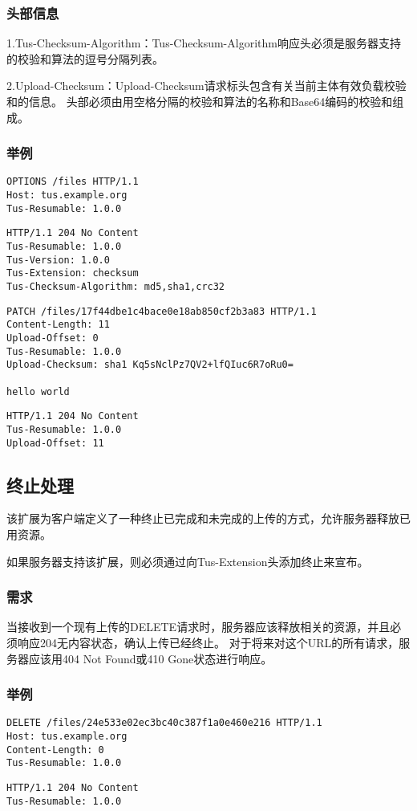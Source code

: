 \documentclass[bachelor]{thesis-uestc}
\begin{document}
\subsubsection{头部信息}
1.Tus-Checksum-Algorithm：Tus-Checksum-Algorithm响应头必须是服务器支持的校验和算法的逗号分隔列表。

2.Upload-Checksum：Upload-Checksum请求标头包含有关当前主体有效负载校验和的信息。 头部必须由用空格分隔的校验和算法的名称和Base64编码的校验和组成。
\subsubsection{举例}
\begin{lstlisting}[title=Request]
OPTIONS /files HTTP/1.1
Host: tus.example.org
Tus-Resumable: 1.0.0
\end{lstlisting}
\begin{lstlisting}[title=Response]
HTTP/1.1 204 No Content
Tus-Resumable: 1.0.0
Tus-Version: 1.0.0
Tus-Extension: checksum
Tus-Checksum-Algorithm: md5,sha1,crc32
\end{lstlisting}
\begin{lstlisting}[title=Request]
PATCH /files/17f44dbe1c4bace0e18ab850cf2b3a83 HTTP/1.1
Content-Length: 11
Upload-Offset: 0
Tus-Resumable: 1.0.0
Upload-Checksum: sha1 Kq5sNclPz7QV2+lfQIuc6R7oRu0=

hello world
\end{lstlisting}
\begin{lstlisting}[title=Response]
HTTP/1.1 204 No Content
Tus-Resumable: 1.0.0
Upload-Offset: 11
\end{lstlisting}

\subsection{终止处理}
该扩展为客户端定义了一种终止已完成和未完成的上传的方式，允许服务器释放已用资源。
\par 如果服务器支持该扩展，则必须通过向Tus-Extension头添加终止来宣布。
\subsubsection{需求}
当接收到一个现有上传的DELETE请求时，服务器应该释放相关的资源，并且必须响应204无内容状态，确认上传已经终止。 对于将来对这个URL的所有请求，服务器应该用404 Not Found或410 Gone状态进行响应。
\subsubsection{举例}
\begin{lstlisting}[title=Request]
DELETE /files/24e533e02ec3bc40c387f1a0e460e216 HTTP/1.1
Host: tus.example.org
Content-Length: 0
Tus-Resumable: 1.0.0
\end{lstlisting}
\begin{lstlisting}[title=Response]
HTTP/1.1 204 No Content
Tus-Resumable: 1.0.0
\end{lstlisting}
\end{document}
